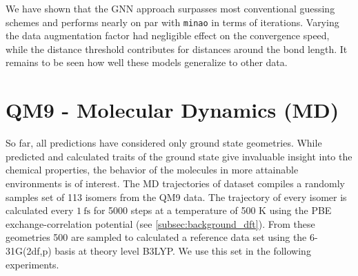 We have shown that the GNN approach surpasses most conventional guessing schemes and performs nearly on par with \texttt{minao} in terms of iterations. Varying the data augmentation factor had negligible effect on the convergence speed, while the distance threshold contributes for distances around the bond length. It remains to be seen how well these models generalize to other data. 

\section{QM9 -  Molecular Dynamics (MD)}
\label{sec:qm9_md_isomers_benchmark}
So far, all predictions have considered only ground state geometries. While predicted and calculated traits of the ground state give invaluable insight into the chemical properties, the behavior of the molecules in more attainable environments is of interest. The MD trajectories of  dataset \parencite{ref:qm9_isomers_md} compiles a randomly samples set of 113 isomers from the QM9  data. The trajectory of every isomer is calculated every $\SI{1}{\femto\second}$ for 5000 steps at a temperature of 500 K using the PBE exchange-correlation potential (see \ref{subsec:background_dft}). From these geometries 500 are sampled to calculated a reference data set using the 6-31G(2df,p) basis at theory level B3LYP. We use this set in the following experiments. 

